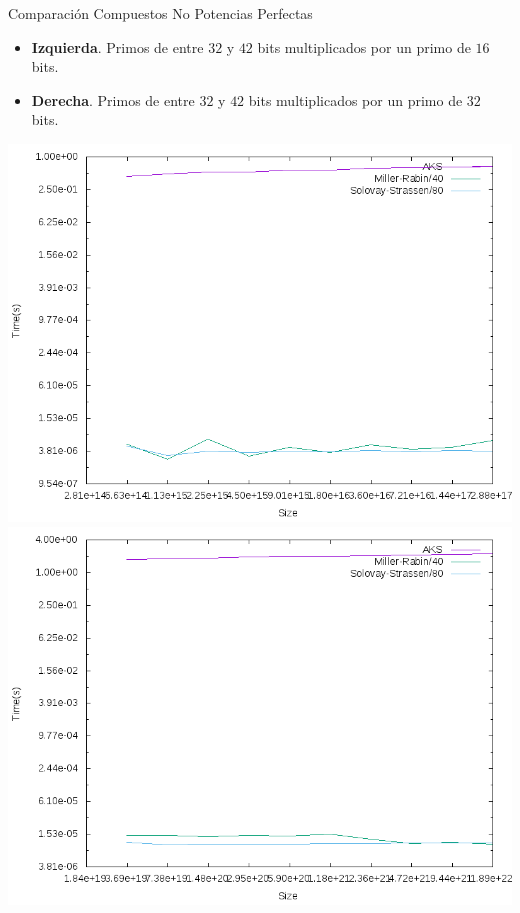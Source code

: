 \documentclass{beamer}
\begin{document}
\begin{frame}{Comparación Compuestos No Potencias Perfectas}
	\onslide<1->
	\begin{itemize}
		\item \textbf{Izquierda}. Primos de entre $32$ y $42$ bits multiplicados por un primo de $16$ bits.
		
		\item \textbf{Derecha}. Primos de entre $32$ y $42$ bits multiplicados por un primo de $32$ bits.
	\end{itemize}
	
	\begin{alertblock}{}
		\begin{center}
			\includegraphics[scale=0.27]{../Memoria/img/graphs/aks-probs-comps-16-mean}
			\includegraphics[scale=0.27]{../Memoria/img/graphs/aks-probs-comps-32-mean}
		\end{center}
	\end{alertblock}
\end{frame}
\end{document}
